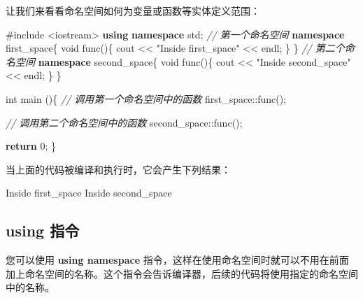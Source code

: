 \documentclass[
]{article}
\newenvironment{Shaded}{}{}
\newcommand{\CommentTok}[1]{\textcolor[rgb]{0.38,0.63,0.69}{\textit{#1}}}
\newcommand{\ControlFlowTok}[1]{\textcolor[rgb]{0.00,0.44,0.13}{\textbf{#1}}}
\newcommand{\DataTypeTok}[1]{\textcolor[rgb]{0.56,0.13,0.00}{#1}}
\newcommand{\DecValTok}[1]{\textcolor[rgb]{0.25,0.63,0.44}{#1}}
\newcommand{\ImportTok}[1]{#1}
\newcommand{\KeywordTok}[1]{\textcolor[rgb]{0.00,0.44,0.13}{\textbf{#1}}}
\newcommand{\NormalTok}[1]{#1}
\newcommand{\OperatorTok}[1]{\textcolor[rgb]{0.40,0.40,0.40}{#1}}
\newcommand{\PreprocessorTok}[1]{\textcolor[rgb]{0.74,0.48,0.00}{#1}}
\newcommand{\StringTok}[1]{\textcolor[rgb]{0.25,0.44,0.63}{#1}}
\begin{document}
让我们来看看命名空间如何为变量或函数等实体定义范围：

\begin{Shaded}
\begin{Highlighting}[]
\PreprocessorTok{\#include }\ImportTok{\textless{}iostream\textgreater{}}
\KeywordTok{using} \KeywordTok{namespace}\NormalTok{ std}\OperatorTok{;}
\CommentTok{// 第一个命名空间}
\KeywordTok{namespace}\NormalTok{ first\_space}\OperatorTok{\{}
   \DataTypeTok{void}\NormalTok{ func}\OperatorTok{()\{}
\NormalTok{      cout }\OperatorTok{\textless{}\textless{}} \StringTok{"Inside first\_space"} \OperatorTok{\textless{}\textless{}}\NormalTok{ endl}\OperatorTok{;}
   \OperatorTok{\}}
\OperatorTok{\}}
\CommentTok{// 第二个命名空间}
\KeywordTok{namespace}\NormalTok{ second\_space}\OperatorTok{\{}
   \DataTypeTok{void}\NormalTok{ func}\OperatorTok{()\{}
\NormalTok{      cout }\OperatorTok{\textless{}\textless{}} \StringTok{"Inside second\_space"} \OperatorTok{\textless{}\textless{}}\NormalTok{ endl}\OperatorTok{;}
   \OperatorTok{\}}
\OperatorTok{\}}

\DataTypeTok{int}\NormalTok{ main }\OperatorTok{()\{} 
   \CommentTok{// 调用第一个命名空间中的函数}
\NormalTok{   first\_space}\OperatorTok{::}\NormalTok{func}\OperatorTok{();}
   
   \CommentTok{// 调用第二个命名空间中的函数}
\NormalTok{   second\_space}\OperatorTok{::}\NormalTok{func}\OperatorTok{();} 

   \ControlFlowTok{return} \DecValTok{0}\OperatorTok{;}
\OperatorTok{\}}
\end{Highlighting}
\end{Shaded}

当上面的代码被编译和执行时，它会产生下列结果：

\begin{Shaded}
\begin{Highlighting}[]
\NormalTok{Inside first\_space}
\NormalTok{Inside second\_space}
\end{Highlighting}
\end{Shaded}

\hypertarget{using-ux6307ux4ee4}{%
\subsection{using 指令}\label{using-ux6307ux4ee4}}

您可以使用 \textbf{using namespace}
指令，这样在使用命名空间时就可以不用在前面加上命名空间的名称。这个指令会告诉编译器，后续的代码将使用指定的命名空间中的名称。
\end{document}
